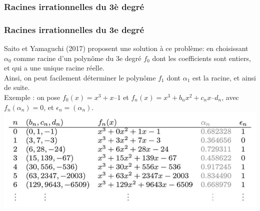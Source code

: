 \documentclass{beamer}
\begin{document}
\subsubsection{Racines irrationnelles du 3è degré}
\begin{frame}
\frametitle{Racines irrationnelles du 3e degré}
Saito et Yamaguchi (2017) proposent une solution à ce problème: en choisissant $\alpha_0$  comme racine d’un polynôme du 3e degré $f_0$ dont les coefficients sont entiers, et qui a une unique racine réelle. \\
Ainsi, on peut facilement déterminer le polynôme $f_1$ dont $\alpha_1$ est la racine, et ainsi de suite. \\
Exemple : on pose $f_0(x) = x^3+x–1$ et $f_n(x) = x^3+b_nx^2+c_nx–d_n$, avec $f_n(\alpha_n) = 0$, et $\epsilon_n = (\alpha_n)$.
\includegraphics[scale=0.75]{img/SaitoYamaguchi2017.png}
\end{frame}
\end{document}
